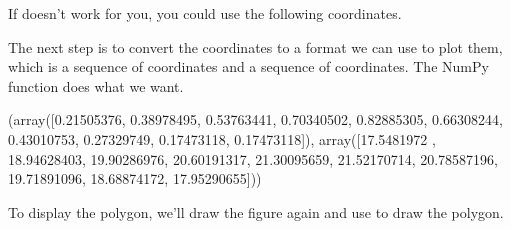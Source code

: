 \documentclass[letterpaper,10pt,english]{sphinxmanual}
\begin{document}
If  doesn’t work for you, you could use the following coordinates.

\begin{sphinxVerbatim}[commandchars=\\\{\}]
   
      \PYG{p}{[}  
                
               
               
               
               \PYG{p}{]}
\end{sphinxVerbatim}

The next step is to convert the coordinates to a format we can use to plot them, which is a sequence of  coordinates and a sequence of  coordinates.  The NumPy function  does what we want.

\begin{sphinxVerbatim}[commandchars=\\\{\}]
   

   
 
\end{sphinxVerbatim}

\begin{sphinxVerbatim}[commandchars=\\\{\}]
(array([0.21505376, 0.38978495, 0.53763441, 0.70340502, 0.82885305,
        0.66308244, 0.43010753, 0.27329749, 0.17473118, 0.17473118]),
 array([17.5481972 , 18.94628403, 19.90286976, 20.60191317, 21.30095659,
        21.52170714, 20.78587196, 19.71891096, 18.68874172, 17.95290655]))
\end{sphinxVerbatim}

To display the polygon, we’ll draw the figure again and use  to draw the polygon.

\begin{sphinxVerbatim}[commandchars=\\\{\}]
 
\end{sphinxVerbatim}
\end{document}
